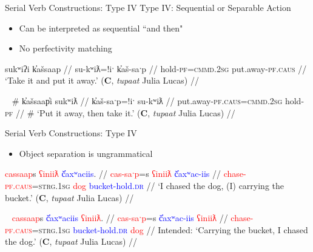 \begin{frame}{Serial Verb Constructions: Type IV}
Type IV: Sequential or Separable Action

\begin{itemize}
\item Can be interpreted as sequential ``and then"
\item No perfectivity matching
\end{itemize}

\ex[exno=20]
\begingl
\glpreamble sukʷiʔi k̓ašsaap //
\gla su-kʷiƛ=!iˑ k̓aš-saˑp //
\glb hold-\textsc{pf}=\textsc{cmmd.2sg} put.away-\textsc{pf.caus} //
\glft `Take it and put it away.' (\textbf{C}, \textit{tupaat} Julia Lucas) //
\endgl \label{ex:foldputaway1}
\xe

\ex[exno=21]~
\begingl
\glpreamble \# k̓ašsaap̓i sukʷiƛ //
\gla k̓aš-saˑp=!iˑ su-kʷiƛ //
\glb put.away-\textsc{pf.caus}=\textsc{cmmd.2sg} hold-\textsc{pf} //
\glft \# `Put it away, then take it.' (\textbf{C}, \textit{tupaat} Julia Lucas) //
\endgl \label{ex:foldputaway2}
\xe

\end{frame}

\begin{frame}[noframenumbering]{Serial Verb Constructions: Type IV}

\begin{itemize}
\item Object separation is ungrammatical
\end{itemize}

\ex
\begingl
\glpreamble \textcolor{red}{cassaap}s \textcolor{red}{ʕiniiƛ} \textcolor{blue}{č̓axʷaciis}. //
\gla \textcolor{red}{cas-saˑp}=s \textcolor{red}{ʕiniiƛ} \textcolor{blue}{č̓axʷac-iis} //
\glb \textcolor{red}{chase-\textsc{pf.caus}}=\textsc{strg.1sg} \textcolor{red}{dog} \textcolor{blue}{bucket-hold.\textsc{dr}} //
\glft `I chased the dog, (I) carrying the bucket.' (\textbf{C}, \textit{tupaat} Julia Lucas) //
\endgl \label{ex:chasedog1}
\xe

\ex~
\begingl
\glpreamble *\textcolor{red}{cassaap}s \textcolor{blue}{č̓axʷaciis} \textcolor{red}{ʕiniiƛ}. //
\gla \textcolor{red}{cas-saˑp}=s \textcolor{blue}{č̓axʷac-iis} \textcolor{red}{ʕiniiƛ} //
\glb \textcolor{red}{chase-\textsc{pf.caus}}=\textsc{strg.1sg} \textcolor{blue}{bucket-hold.\textsc{dr}} \textcolor{red}{dog} //
\glft Intended: `Carrying the bucket, I chased the dog.' (\textbf{C}, \textit{tupaat} Julia Lucas) //
\endgl \label{ex:chasedog3}
\xe

\end{frame}


